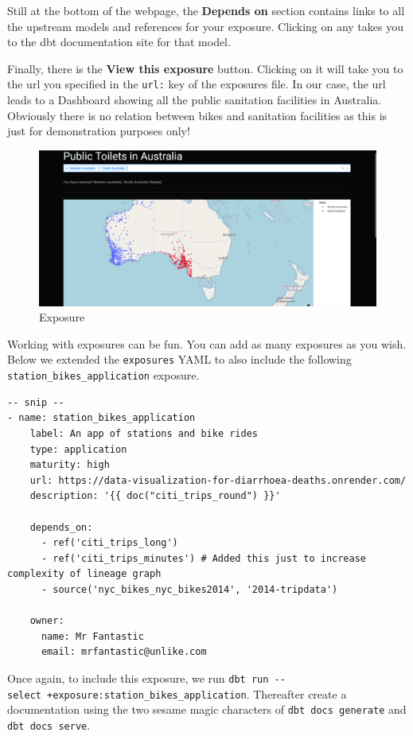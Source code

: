 \documentclass[
]{book}
\begin{document}
Still at the bottom of the webpage, the \textbf{Depends on} section contains links to all the upstream models and references for your exposure. Clicking on any takes you to the dbt documentation site for that model.

Finally, there is the \textbf{View this exposure} button. Clicking on it will take you to the url you specified in the \texttt{url:} key of the exposures file. In our case, the url leads to a Dashboard showing all the public sanitation facilities in Australia. Obviously there is no relation between bikes and sanitation facilities as this is just for demonstration purposes only!

\begin{figure}
\centering
\includegraphics{./images/exposure_hyperlink.png}
\caption{Exposure}
\end{figure}

Working with exposures can be fun. You can add as many exposures as you wish. Below we extended the \texttt{exposures} YAML to also include the following \texttt{station\_bikes\_application} exposure.

\begin{verbatim}
-- snip --
- name: station_bikes_application
    label: An app of stations and bike rides
    type: application
    maturity: high
    url: https://data-visualization-for-diarrhoea-deaths.onrender.com/
    description: '{{ doc("citi_trips_round") }}'

    depends_on:
      - ref('citi_trips_long')
      - ref('citi_trips_minutes') # Added this just to increase complexity of lineage graph
      - source('nyc_bikes_nyc_bikes2014', '2014-tripdata')

    owner:
      name: Mr Fantastic
      email: mrfantastic@unlike.com
\end{verbatim}

Once again, to include this exposure, we run \texttt{dbt\ run\ -\/-select\ +exposure:station\_bikes\_application}. Thereafter create a documentation using the two sesame magic characters of \texttt{dbt\ docs\ generate} and \texttt{dbt\ docs\ serve}.
\end{document}
